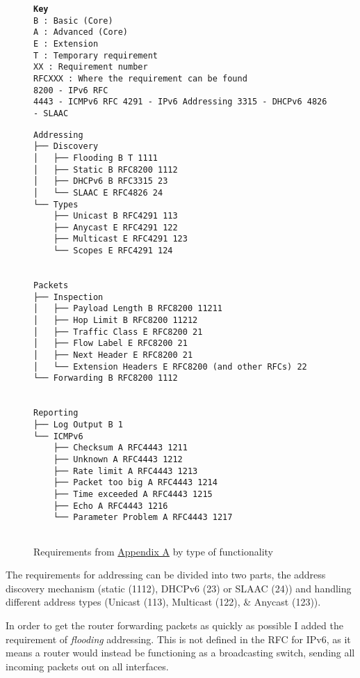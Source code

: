\documentclass[12pt,a4paper,twoside,openany]{report}
\begin{document}
\begin{figure}
\texttt{\textbf{Key} \\
B : Basic (Core) \\
A : Advanced (Core) \\
E : Extension \\
T : Temporary requirement \\
XX : Requirement number \\
RFCXXX : Where the requirement can be found \\
   8200 - IPv6 RFC\cite{ipv6_rfc} \\
   4443 - ICMPv6 RFC\cite{icmpv6_rfc}
   4291 - IPv6 Addressing\cite{ipv6_rfc_adr}
   3315 - DHCPv6\cite{dhcpv6_rfc}
   4826 - SLAAC\cite{slaac_rfc}
}
\begin{lstlisting}[style=tree]
Addressing
├── Discovery
│   ├── Flooding B T 1111 
│   ├── Static B RFC8200 1112
│   ├── DHCPv6 B RFC3315 23
│   └── SLAAC E RFC4826 24
└── Types
    ├── Unicast B RFC4291 113
    ├── Anycast E RFC4291 122
    ├── Multicast E RFC4291 123
    └── Scopes E RFC4291 124


Packets
├── Inspection
│   ├── Payload Length B RFC8200 11211
│   ├── Hop Limit B RFC8200 11212
│   ├── Traffic Class E RFC8200 21
│   ├── Flow Label E RFC8200 21
│   ├── Next Header E RFC8200 21
│   └── Extension Headers E RFC8200 (and other RFCs) 22
└── Forwarding B RFC8200 1112


Reporting
├── Log Output B 1
└── ICMPv6  
    ├── Checksum A RFC4443 1211
    ├── Unknown A RFC4443 1212
    ├── Rate limit A RFC4443 1213
    ├── Packet too big A RFC4443 1214
    ├── Time exceeded A RFC4443 1215
    ├── Echo A RFC4443 1216
    └── Parameter Problem A RFC4443 1217
 
\end{lstlisting}
\caption{Requirements from \hyperref[appendix::requirements]{Appendix A} by type of functionality}
\label{fig::requirements}
\end{figure}

\bigskip

The requirements for addressing can be divided into two parts, the address discovery mechanism (static (1112), DHCPv6\cite{dhcpv6_rfc} (23) or SLAAC\cite{slaac_rfc} (24)) and handling different address types (Unicast (113), Multicast (122), \& Anycast (123)).  

In order to get the router forwarding packets as quickly as possible I added the requirement of \textit{flooding} addressing.  This is not defined in the RFC for IPv6, as it means a router would instead be functioning as a broadcasting switch, sending all incoming packets out on all interfaces.
\end{document}
